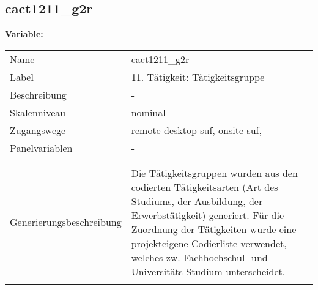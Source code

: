 	
	
	\subsection{cact1211\_g2r}
	\label{subSection:cact1211_g2r}

	\noindent\textbf{Variable:}\\
		\begin{tabular}{lL{11.3cm}}
			\label{tableVariable:cact1211_g2r}
			Name & cact1211\_g2r \\
			Label & 11. Tätigkeit: Tätigkeitsgruppe  \\
			Beschreibung & - \\
			Skalenniveau & nominal \\
			Zugangswege &
				remote-desktop-suf,
				onsite-suf,
 \\
			Panelvariablen & -
			 \\
			 \\
 \\
					Generierungsbeschreibung & Die Tätigkeitsgruppen wurden aus den codierten Tätigkeitsarten (Art des Studiums, der Ausbildung, der Erwerbstätigkeit) generiert. Für die Zuordnung der Tätigkeiten wurde eine projekteigene Codierliste verwendet, welches zw. Fachhochschul- und Universitäts-Studium unterscheidet.
				 \\	
			 \\
		\end{tabular}






